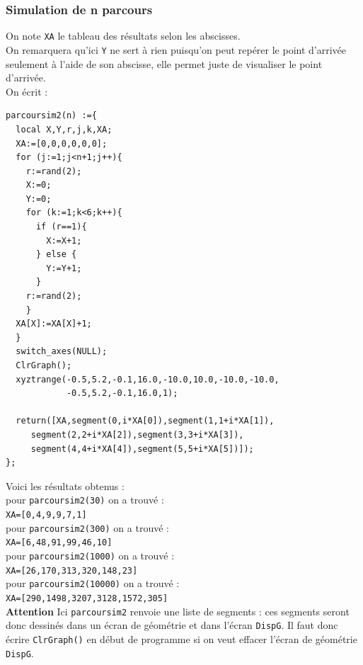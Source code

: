 \documentclass[a4paper,11pt]{book}
\begin{document}
\subsubsection{Simulation de n  parcours}
On note {\tt XA} le tableau des r\'esultats selon les abscisses.\\ 
On remarquera qu'ici {\tt Y} ne sert \`a rien puisqu'on peut rep\'erer le 
point d'arriv\'ee seulement \`a l'aide de son abscisse, elle permet juste de 
visualiser le point d'arriv\'ee.\\
On \'ecrit :
\begin{verbatim}
parcoursim2(n) :={
  local X,Y,r,j,k,XA;
  XA:=[0,0,0,0,0,0];
  for (j:=1;j<n+1;j++){
    r:=rand(2);
    X:=0;
    Y:=0;
    for (k:=1;k<6;k++){
      if (r==1){
        X:=X+1;
      } else {
        Y:=Y+1;
      }
    r:=rand(2);
    }
  XA[X]:=XA[X]+1;
  }
  switch_axes(NULL);
  ClrGraph();
  xyztrange(-0.5,5.2,-0.1,16.0,-10.0,10.0,-10.0,-10.0,
            -0.5,5.2,-0.1,16.0,1);
 
  return([XA,segment(0,i*XA[0]),segment(1,1+i*XA[1]),
     segment(2,2+i*XA[2]),segment(3,3+i*XA[3]),
     segment(4,4+i*XA[4]),segment(5,5+i*XA[5])]);
}; 
\end{verbatim} 
Voici les r\'esultats obtenus :\\
pour {\tt parcoursim2(30)} on a trouv\'e :\\
{\tt XA=[0,4,9,9,7,1]}\\
pour {\tt parcoursim2(300)} on a trouv\'e :\\
{\tt XA=[6,48,91,99,46,10]}\\
pour {\tt parcoursim2(1000)} on a trouv\'e :\\
{\tt XA=[26,170,313,320,148,23]}\\
pour {\tt parcoursim2(10000)} on a trouv\'e :\\
{\tt XA=[290,1498,3207,3128,1572,305]}\\
{\bf Attention}
Ici {\tt parcoursim2} renvoie une liste de segments  : ces segments seront 
donc dessin\'es dans un \'ecran de g\'eom\'etrie et dans l'\'ecran {\tt DispG}.
Il faut donc \'ecrire {\tt ClrGraph()} en d\'ebut de 
programme si on veut effacer l'\'ecran de g\'eom\'etrie {\tt DispG}.
\end{document}

